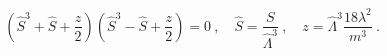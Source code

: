 \begin{equation}\label{qs:g2}
\left(\hat S^3 + \hat S + \frac{z}{2}\right)
\left(\hat S^3 - \hat S + \frac{z}{2}\right)
 = 0~,\quad \hat S = \frac{S}{\hat\Lambda^3}~,
\quad z = \hat\Lambda^3 \frac{18 \lambda^2}{m^3} ~.
\end{equation}

